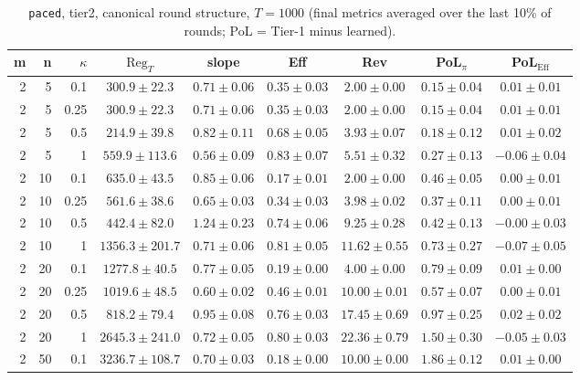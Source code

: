 \begin{table}[htbp]
\centering
\scriptsize
\caption{\texttt{paced}, tier2, canonical round structure, $T=1000$ (final metrics averaged over the last 10\% of rounds; PoL = Tier-1 minus learned).}
\label{tab:tier2_paced_canonical}
\begin{tabular}{@{}rrrcccccc@{}}
\toprule
m & n & $\kappa$ & $\mathrm{Reg}_T$ & slope & Eff & Rev & PoL$_\pi$ & PoL$_\mathrm{Eff}$ \\
\midrule
2 & 5 & 0.1 & $300.9 \pm 22.3$ & $0.71 \pm 0.06$ & $0.35 \pm 0.03$ & $2.00 \pm 0.00$ & $0.15 \pm 0.04$ & $0.01 \pm 0.01$ \\
2 & 5 & 0.25 & $300.9 \pm 22.3$ & $0.71 \pm 0.06$ & $0.35 \pm 0.03$ & $2.00 \pm 0.00$ & $0.15 \pm 0.04$ & $0.01 \pm 0.01$ \\
2 & 5 & 0.5 & $214.9 \pm 39.8$ & $0.82 \pm 0.11$ & $0.68 \pm 0.05$ & $3.93 \pm 0.07$ & $0.18 \pm 0.12$ & $0.01 \pm 0.02$ \\
2 & 5 & 1 & $559.9 \pm 113.6$ & $0.56 \pm 0.09$ & $0.83 \pm 0.07$ & $5.51 \pm 0.32$ & $0.27 \pm 0.13$ & $-0.06 \pm 0.04$ \\
2 & 10 & 0.1 & $635.0 \pm 43.5$ & $0.85 \pm 0.06$ & $0.17 \pm 0.01$ & $2.00 \pm 0.00$ & $0.46 \pm 0.05$ & $0.00 \pm 0.01$ \\
2 & 10 & 0.25 & $561.6 \pm 38.6$ & $0.65 \pm 0.03$ & $0.34 \pm 0.03$ & $3.98 \pm 0.02$ & $0.37 \pm 0.11$ & $0.00 \pm 0.01$ \\
2 & 10 & 0.5 & $442.4 \pm 82.0$ & $1.24 \pm 0.23$ & $0.74 \pm 0.06$ & $9.25 \pm 0.28$ & $0.42 \pm 0.13$ & $-0.00 \pm 0.03$ \\
2 & 10 & 1 & $1356.3 \pm 201.7$ & $0.71 \pm 0.06$ & $0.81 \pm 0.05$ & $11.62 \pm 0.55$ & $0.73 \pm 0.27$ & $-0.07 \pm 0.05$ \\
2 & 20 & 0.1 & $1277.8 \pm 40.5$ & $0.77 \pm 0.05$ & $0.19 \pm 0.00$ & $4.00 \pm 0.00$ & $0.79 \pm 0.09$ & $0.01 \pm 0.00$ \\
2 & 20 & 0.25 & $1019.6 \pm 48.5$ & $0.60 \pm 0.02$ & $0.46 \pm 0.01$ & $10.00 \pm 0.01$ & $0.57 \pm 0.07$ & $0.00 \pm 0.01$ \\
2 & 20 & 0.5 & $818.2 \pm 79.4$ & $0.95 \pm 0.08$ & $0.76 \pm 0.03$ & $17.45 \pm 0.69$ & $0.97 \pm 0.25$ & $0.02 \pm 0.02$ \\
2 & 20 & 1 & $2645.3 \pm 241.0$ & $0.72 \pm 0.05$ & $0.80 \pm 0.03$ & $22.36 \pm 0.79$ & $1.50 \pm 0.30$ & $-0.05 \pm 0.03$ \\
2 & 50 & 0.1 & $3236.7 \pm 108.7$ & $0.70 \pm 0.03$ & $0.18 \pm 0.00$ & $10.00 \pm 0.00$ & $1.86 \pm 0.12$ & $0.01 \pm 0.00$ \\

\end{tabular}
\end{table}
